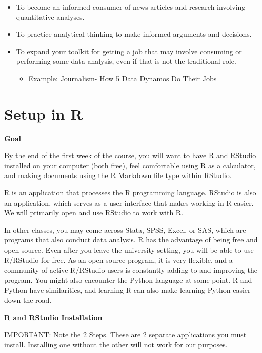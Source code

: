 \documentclass[
  letterpaper,
  DIV=11,
  numbers=noendperiod]{scrreprt}
\providecommand{\tightlist}{%
  \setlength{\itemsep}{0pt}\setlength{\parskip}{0pt}}\usepackage{longtable,booktabs,array}
\begin{document}
\begin{itemize}
\tightlist
\item
  To become an informed consumer of news articles and research involving
  quantitative analyses.
\item
  To practice analytical thinking to make informed arguments and
  decisions.
\item
  To expand your toolkit for getting a job that may involve consuming or
  performing some data analysis, even if that is not the traditional
  role.

  \begin{itemize}
  \tightlist
  \item
    Example: Journalism-
    \href{https://www.nytimes.com/2019/06/12/reader-center/data-reporting-spreadsheets.html}{How
    5 Data Dynamos Do Their Jobs}
  \end{itemize}
\end{itemize}

\hypertarget{rsetup}{%
\section{Setup in R}\label{rsetup}}

\textbf{Goal}

By the end of the first week of the course, you will want to have R and
RStudio installed on your computer (both free), feel comfortable using R
as a calculator, and making documents using the R Markdown file type
within RStudio.

R is an application that processes the R programming language. RStudio
is also an application, which serves as a user interface that makes
working in R easier. We will primarily open and use RStudio to work with
R.

In other classes, you may come across Stata, SPSS, Excel, or SAS, which
are programs that also conduct data analysis. R has the advantage of
being free and open-source. Even after you leave the university setting,
you will be able to use R/RStudio for free. As an open-source program,
it is very flexible, and a community of active R/RStudio users is
constantly adding to and improving the program. You might also encounter
the Python language at some point. R and Python have similarities, and
learning R can also make learning Python easier down the road.

\textbf{R and RStudio Installation}

IMPORTANT: Note the 2 Steps. These are 2 separate applications you must
install. Installing one without the other will not work for our
purposes.
\end{document}
